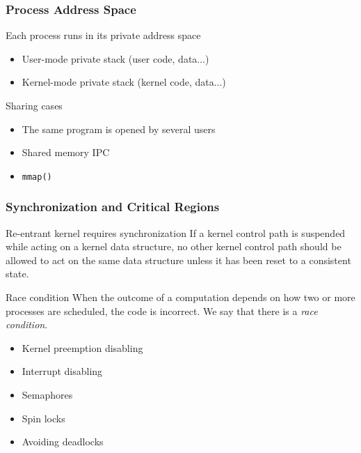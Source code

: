 \subsubsection{Process Address Space}

\begin{frame}
  \begin{block}{Each process runs in its private address space}
    \begin{itemize}
    \item User-mode private stack (user code, data...)
    \item Kernel-mode private stack (kernel code, data...)
    \end{itemize}
  \end{block}
  \begin{block}{Sharing cases}
    \begin{itemize}
    \item The same program is opened by several users
    \item Shared memory IPC
    \item \texttt{mmap()}
    \end{itemize}
  \end{block}
\end{frame}

\subsubsection{Synchronization and Critical Regions}

\begin{frame}
  \begin{block}{Re-entrant kernel requires synchronization}
    If a kernel control path is suspended while acting on a kernel data structure, no
    other kernel control path should be allowed to act on the same data structure unless
    it has been reset to a consistent state.
  \end{block}
  \begin{block}{Race condition}
    When the outcome of a computation depends on how two or more processes are scheduled,
    the code is incorrect. We say that there is a \emph{race condition}.
    \begin{itemize}
    \item Kernel preemption disabling
    \item Interrupt disabling
    \item Semaphores
    \item Spin locks
    \item Avoiding deadlocks
    \end{itemize}
  \end{block}
\end{frame}

